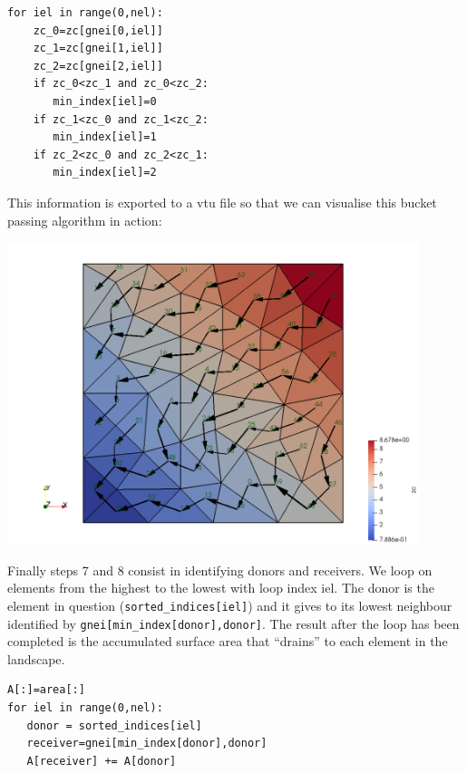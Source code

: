 \begin{lstlisting}
for iel in range(0,nel):
    zc_0=zc[gnei[0,iel]]
    zc_1=zc[gnei[1,iel]]
    zc_2=zc[gnei[2,iel]]
    if zc_0<zc_1 and zc_0<zc_2: 
       min_index[iel]=0
    if zc_1<zc_0 and zc_1<zc_2: 
       min_index[iel]=1
    if zc_2<zc_0 and zc_2<zc_1: 
       min_index[iel]=2
\end{lstlisting}

This information is exported to a vtu file so that we can visualise 
this bucket passing algorithm in action:

\begin{center}
\includegraphics[width=12cm]{python_codes/fieldstone_140/images/mesh7}
\end{center}

Finally steps 7 and 8 consist in identifying donors and receivers. 
We loop on elements from the highest to the lowest with loop index iel.
The donor is the element in question ({\tt sorted\_indices[iel]}) and 
it gives to its lowest neighbour identified by {\tt gnei[min\_index[donor],donor]}.
The result after the loop has been
completed is the accumulated surface area that ``drains'' to each element in the landscape.

\begin{lstlisting}
A[:]=area[:]
for iel in range(0,nel):
   donor = sorted_indices[iel] 
   receiver=gnei[min_index[donor],donor]
   A[receiver] += A[donor] 
\end{lstlisting}

